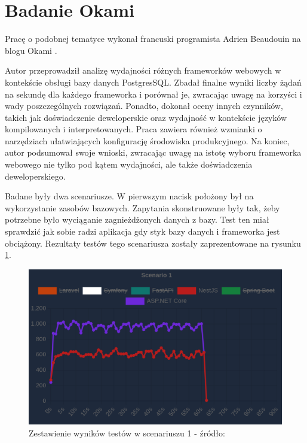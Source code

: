 \section{Badanie Okami}
Pracę o podobnej tematyce wykonał francuski programista Adrien Beaudouin na blogu Okami \cite{okami1012024Benchmark}.

Autor przeprowadził analizę wydajności różnych frameworków webowych w kontekście obsługi bazy danych PostgresSQL.
Zbadał finalne wyniki liczby żądań na sekundę dla każdego frameworka i porównał je, zwracając uwagę na korzyści i wady poszczególnych rozwiązań. 
Ponadto, dokonał oceny innych czynników, takich jak doświadczenie deweloperskie oraz wydajność w kontekście języków kompilowanych i interpretowanych.
Praca zawiera również wzmianki o narzędziach ułatwiających konfigurację środowiska produkcyjnego.
Na koniec, autor podsumował swoje wnioski, zwracając uwagę na istotę wyboru frameworka webowego nie tylko pod kątem wydajności, ale także doświadczenia deweloperskiego.

Badane były dwa scenariusze.
W pierwszym nacisk położony był na wykorzystanie zasobów bazowych. 
Zapytania skonstruowane były tak, żeby potrzebne było wyciąganie zagnieżdżonych danych z bazy.
Test ten miał sprawdzić jak sobie radzi aplikacja gdy styk bazy danych i frameworka jest obciążony.
Rezultaty testów tego scenariusza zostały zaprezentowane na rysunku \ref{rys:oklatest1}.
\begin{figure}[!hb]
	\centering \includegraphics[width=1\linewidth]{rysunki/okla_test_1.png}
	\caption{Zestawienie wyników testów w scenariuszu 1 - źródło: \cite{okami1012024Benchmark}}
	\label{rys:oklatest1}
\end{figure}

